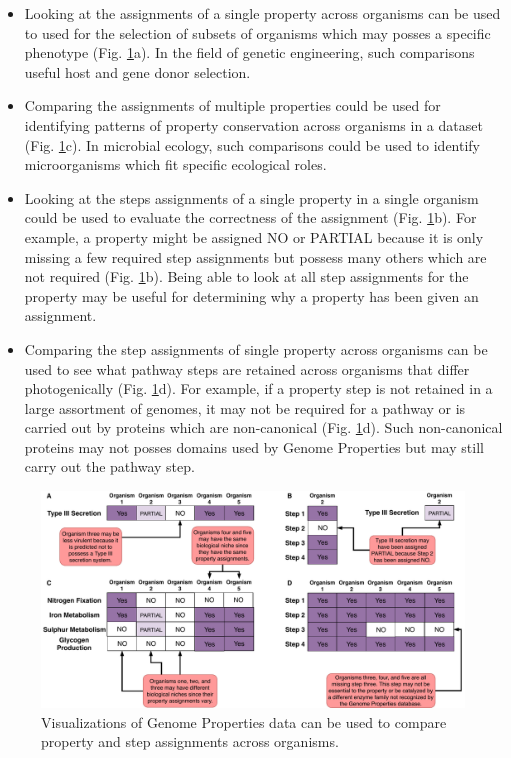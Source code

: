 \begin{itemize}
\item Looking at the assignments of a single property across organisms can be used to used for the selection of subsets of organisms which may posses a specific phenotype (Fig. \ref{fig:client-analysis-types}a). In the field of genetic engineering, such comparisons useful host and gene donor selection.
\item Comparing the assignments of multiple properties could be used for identifying patterns of property conservation across organisms in a dataset (Fig. \ref{fig:client-analysis-types}c). In microbial ecology, such comparisons could be used to identify microorganisms which fit specific ecological roles.
\item Looking at the steps assignments of a single property in a single organism could be used to evaluate the correctness of the  assignment (Fig. \ref{fig:client-analysis-types}b). For example, a property might be assigned NO or PARTIAL because it is only missing a few required step assignments but possess many others which are not required (Fig. \ref{fig:client-analysis-types}b). Being able to look at all step assignments for the property may be useful for determining why a property has been given an assignment.
\item Comparing the step assignments of single property across organisms can be used to see what pathway steps are retained across organisms that differ photogenically (Fig. \ref{fig:client-analysis-types}d). For example, if a property step is not retained in a large assortment of genomes, it may not be required for a pathway or is carried out by proteins which are non-canonical (Fig. \ref{fig:client-analysis-types}d). Such non-canonical proteins may not posses domains used by Genome Properties but may still carry out the pathway step.
\end{itemize}

\begin{figure}[!ht]
  \centering
	\includegraphics[width=\textwidth]{media/analysis_types.pdf}
	 \caption{Visualizations of Genome Properties data can be used to compare property and step assignments across organisms.}
	 \label{fig:client-analysis-types}
\end{figure}

